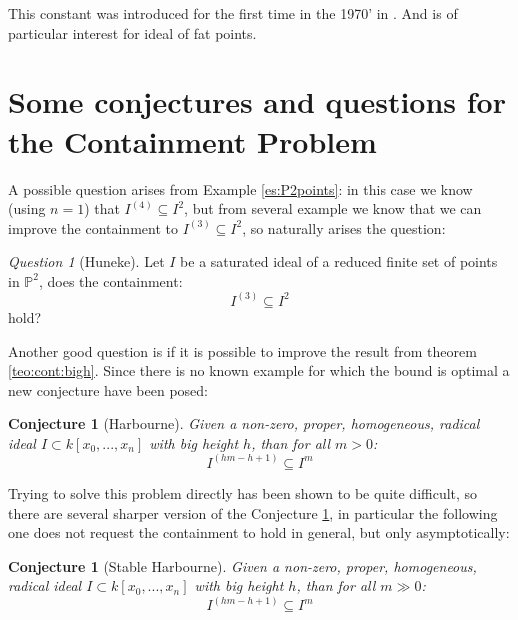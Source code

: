 \documentclass[notitlepage, a4]{book}
\theoremstyle{plain}
\newtheorem{conj}[teo]{Conjecture}
\theoremstyle{remark}
\newtheorem{que}[rem]{Question}
\theoremstyle{definition}
\newcommand{\PP}{\mathbb{P}}
\newcommand{\cont}[2]{ I^{(#1)} \subseteq I^{#2}}
\newcounter{que}
\begin{document}
This constant was introduced for the first time in the 1970' in \cite{Wald77}. And is of particular interest for ideal of fat points. 

\section[Conjectures]{Some conjectures and questions for the Containment Problem}
	A possible question arises from Example \ref{es:P2points}: in this case we know (using $ n=1 $) that $ \cont{4}{2}$, but from several example we know that we can improve the containment to $ \cont{3}{2} $, so naturally arises the question:
	\begin{que}[Huneke] \label{que:32}
	Let $ I $ be a saturated ideal of a reduced finite set of points in $ \PP^2 $, does the containment:
	\[ \cont{3}{2} \]
	hold?
	\end{que}
	
%	
	
	Another good question is if it is possible to improve the result from theorem \ref{teo:cont:bigh}. Since there is no known example for which the bound is optimal a new conjecture have been posed:
	
	\begin{conj}[Harbourne]\label{conj:harb}
		Given a non-zero, proper, homogeneous, radical ideal $ I \subset k[x_0 , ... , x_n] $ with big height $ h $, than for all $ m > 0 $:
		\[
		\cont{hm - h +1}{m}
		\]
	\end{conj}
	
	Trying to solve this problem directly has been shown to be quite difficult, so there are several  sharper version of the Conjecture \ref{conj:harb}, in particular the following one does not request the containment to hold in general, but only asymptotically:
	
	\begin{conj}[Stable Harbourne]\label{conj:stabharb}
			Given a non-zero, proper, homogeneous, radical ideal $ I \subset k[x_0 , ... , x_n] $ with big height $ h $, than for all $ m \gg 0 $:
			\[
			\cont{hm - h +1}{m}
			\]
	\end{conj} 
	
\end{document}
